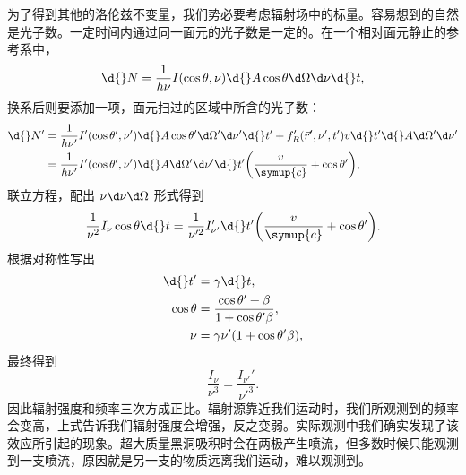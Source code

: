 \documentclass[../天体物理基础.tex]{subfiles}
\begin{document}
为了得到其他的洛伦兹不变量，我们势必要考虑辐射场中的标量。容易想到的自然是光子数。一定时间内通过同一面元的光子数是一定的。在一个相对面元静止的参考系中，
\begin{equation}
\d{}N=\frac{1}{h\nu}I\mleft(\cos{\theta},\nu\mright)\d{}A\cos{\theta}\d\Omega\d\nu \d{}t,
\end{equation}
换系后则要添加一项，面元扫过的区域中所含的光子数：
\begin{align}
\d{}N'&=\frac{1}{h\nu'}I'\mleft(\cos{\theta'},\nu'\mright)\d{}A\cos{\theta'}\d\Omega'\d\nu' \d{}t'+f_{R}'\mleft(\vec{r}',\nu', t'\mright) v\d{}t'\d{}A\d\Omega'\d\nu'\notag\\
&=\frac{1}{h\nu'}I'\mleft(\cos{\theta'},\nu'\mright)\d{}A\d\Omega'\d\nu'\d{}t'\mleft(\frac{v}{\symup{c}}+\cos{\theta'}\mright),
\end{align}
联立方程，配出 $\nu\d\nu\d\Omega$ 形式得到
\begin{equation}
\frac{1}{\nu^{2}}I_{\nu}\cos{\theta}\d{}t=\frac{1}{\nu'^{2}}I_{\nu'}'\d{}t'\mleft(\frac{v}{\symup{c}}+\cos{\theta'}\mright).
\end{equation}
根据对称性写出
\begin{align}
\d{}t'&=\gamma\d{}t,\\
\cos{\theta}&=\dfrac{\cos{\theta'}+\beta}{1+\cos{\theta'}\beta},\\
\nu&=\gamma\nu'\mleft(1+\cos{\theta'}\beta\mright),
\end{align}
最终得到
\begin{equation}
\frac{I_{\nu}}{\nu^{3}}=\frac{I_{\nu'}'}{\nu'^{3}}.
\end{equation}
因此辐射强度和频率三次方成正比。辐射源靠近我们运动时，我们所观测到的频率会变高，上式告诉我们辐射强度会增强，反之变弱。实际观测中我们确实发现了该效应所引起的现象。超大质量黑洞吸积时会在两极产生喷流，但多数时候只能观测到一支喷流，原因就是另一支的物质远离我们运动，难以观测到。
\end{document}
